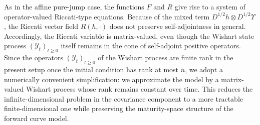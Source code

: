 \documentclass[10pt,a4paper,reqno]{amsart}
\numberwithin{equation}{section}
\theoremstyle{plain}
\theoremstyle{definition}
\theoremstyle{example}
\newcommand{\cY}{\mathcal{Y}}
\begin{document}
As in the affine pure-jump case, the functions $F$ and $R$ give rise to a system of operator-valued Riccati-type equations.  
Because of the mixed term $D^{1/2}h\otimes D^{1/2}\Upsilon$, the Riccati vector field $R(h,\cdot)$ does not preserve self-adjointness in general. Accordingly, the Riccati variable is matrix-valued, even though the Wishart state process $(\cY_t)_{t\ge0}$ itself remains in the cone of self-adjoint positive operators.
Since the operators $(\mathcal{Y}_t)_{t\geq0}$ of the Wishart process are finite rank in the present setup once the initial condition has rank at most $n$, we adopt a numerically convenient simplification:  
we approximate the model by a matrix-valued Wishart process whose rank remains constant over time.  
This reduces the infinite-dimensional problem in the covariance component to a more tractable finite-dimensional one while preserving the maturity-space structure of the forward curve model.
\end{document}
